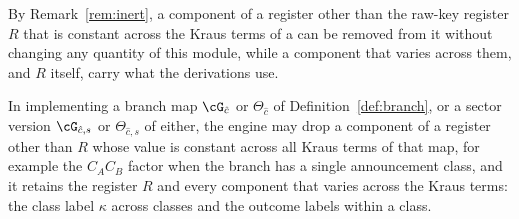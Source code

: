 
By Remark~\ref{rem:inert}, a component of a register other than the
raw-key register $R$ that is constant across the Kraus terms of a
 can be removed from it without changing any quantity of
this module, while a component that varies across them, and $R$ itself,
carry what the derivations use.

\begin{requirement}\label{req:branch-register-components}
In implementing a branch map $\cG_{\hat c}$ or $\Theta_{\hat c}$ of
Definition~\ref{def:branch}, or a sector version $\cG_{\hat c,s}$ or
$\Theta_{\hat c,s}$ of either, the engine may drop a component of a register
other than $R$ whose value is constant across all Kraus terms of that map,
for example the $C_AC_B$ factor when the branch has a single announcement
class, and it retains the register $R$ and every component that varies
across the Kraus terms: the class label $\kappa$ across classes and the
outcome labels within a class.
\end{requirement}
